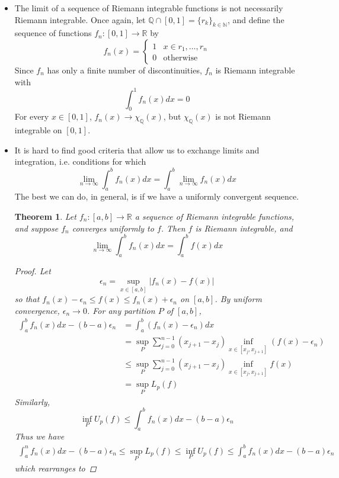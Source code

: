 \documentclass[10pt]{article}         %
\newtheorem{theorem}{Theorem}[section]
\theoremstyle{remark}
\newcommand{\N}{\mathbb{N}}
\newcommand{\R}{\mathbb{R}}
\newcommand{\Q}{\mathbb{Q}}
\begin{document}
\begin{itemize}
    \item The limit of a sequence of Riemann integrable functions is not necessarily Riemann integrable. Once again, let $\Q \cap [0, 1] = \{ r_k \}_{k \in \N}$, and define the sequence of functions $f_n: [0, 1] \rightarrow \R$ by
    \[
    f_n(x) = \begin{cases}
    1 & x \in {r_1, \dots, r_n} \\
    0 & \text{otherwise}
    \end{cases}
    \]
    Since $f_n$ has only a finite number of discontinuities, $f_n$ is Riemann integrable with
    \[
    \int_0^1 f_n(x) dx = 0
    \]
    For every $x \in [0, 1]$, $f_n(x) \rightarrow \chi_\Q(x)$, but $\chi_\Q(x)$ is not Riemann integrable on $[0, 1]$.
    \item It is hard to find good criteria that allow us to exchange limits and integration, i.e. conditions for which
    \[
    \lim_{n\rightarrow\infty}\int_a^b f_n(x) dx = \int_a^b \lim_{n\rightarrow\infty} f_n(x) dx
    \]
    The best we can do, in general, is if we have a uniformly convergent sequence.
    \begin{theorem}
    Let $f_n: [a, b] \rightarrow \R$ a sequence of Riemann integrable functions, and suppose $f_n$ converges uniformly to $f$. Then $f$ is Riemann integrable, and
     \[
    \lim_{n\rightarrow\infty}\int_a^b f_n(x) dx = \int_a^b f(x) dx
    \]
    \begin{proof}
    Let 
    \[
    \epsilon_n = \sup_{x \in [a, b]}|f_n(x) - f(x)|
    \]
    so that $f_n(x) - \epsilon_n \leq f(x) \leq f_n(x) + \epsilon_n$ on $[a, b]$. By uniform convergence, $\epsilon_n \rightarrow 0$. For any partition $P$ of $[a, b]$,
    \begin{align*}
    \int_a^b f_n(x) dx - (b-a)\epsilon_n &=
    \int_a^b (f_n(x) - \epsilon_n) dx \\
    &= \sup_P \sum_{j = 0}^{n-1} (x_{j+1} - x_j) \inf_{x \in [x_j, x_{j+1}]} (f(x) - \epsilon_n) \\
    &\leq \sup_P \sum_{j = 0}^{n-1} (x_{j+1} - x_j) \inf_{x \in [x_j, x_{j+1}]} f(x) \\
    &= \sup_P L_p(f)
    \end{align*}
    Similarly,
    \[
    \inf_P U_p(f) \leq \int_a^b f_n(x) dx - (b-a)\epsilon_n
    \]
    Thus we have
    \begin{align*}
    \int_a^n f_n(x) dx - (b-a)\epsilon_n \leq \sup_P L_p(f) \leq \inf_P U_p(f) \leq \int_a^b f_n(x) dx - (b-a)\epsilon_n
    \end{align*}
    which rearranges to

\end{proof}
\end{theorem}
\end{itemize}
\end{document}
